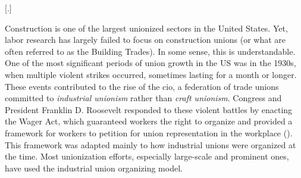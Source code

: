 \documentclass[12pt]{article}
\newlength{\myindent}
\begin{document}
\clearpage

\tableofcontents
\clearpage

\listoffigures
\clearpage

[.\hspace{0.5em}]

\titlespacing*{\section}{0pt}{0pt}{0pt} %
\titlespacing*{\subsection}{0pt}{0pt}{0pt}
\titlespacing*{\subsubsection}{0pt}{0pt}{1em}



Construction is one of the largest unionized sectors in the United States. Yet, labor research has largely failed to focus on construction unions (or what are often referred to as the Building Trades). In some sense, this is understandable. One of the most significant periods of union growth in the US was in the 1930s, when multiple violent strikes occurred, sometimes lasting for a month or longer. These events contributed to the rise of the \acrfull{cio}, a federation of trade unions committed to \emph{industrial unionism} rather than \emph{craft unionism}. Congress and President Franklin D. Roosevelt responded to these violent battles by enacting the Wager Act, which guaranteed workers the right to organize and provided a framework for workers to petition for union representation in the workplace (\cite{grossMakingNationalLabor1974}). This framework was adapted mainly to how industrial unions were organized at the time. Most unionization efforts, especially large-scale and prominent ones, have used the industrial union organizing model.
\end{document}
